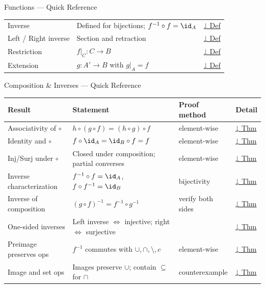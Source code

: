 \begin{toolkitbox}{Functions — Quick Reference}
\begin{tabular}{l l l}
Inverse           & Defined for bijections; $f^{-1} \circ f = \id_A$            & \hyperref[def:inverse]{↓ Def} \\
Left / Right inverse & Section and retraction                                  & \hyperref[def:left-right-inverse]{↓ Def} \\
Restriction       & $f|_C : C \to B$                                            & \hyperref[def:restriction]{↓ Def} \\
Extension         & $g : A' \to B$ with $g|_A = f$                              & \hyperref[def:extension]{↓ Def} \\
\bottomrule
\end{tabular}
\end{toolkitbox}



\begin{toolkitbox}{Composition \& Inverses — Quick Reference}
\small
\begin{tabular}{l l l l}
\toprule
\textbf{Result} & \textbf{Statement} & \textbf{Proof method} & \textbf{Detail} \\
\midrule
Associativity of $\circ$ & $h \circ (g \circ f) = (h \circ g) \circ f$ & element-wise & \hyperref[thm:comp-assoc]{↓ Thm} \\
Identity and $\circ$     & $f \circ \id_A = \id_B \circ f = f$          & element-wise & \hyperref[thm:comp-id]{↓ Thm} \\
Inj/Surj under $\circ$   & Closed under composition; partial converses  & element-wise & \hyperref[thm:comp-inj-surj]{↓ Thm} \\
Inverse characterization & $f^{-1}\circ f = \id_A$, $f \circ f^{-1} = \id_B$ & bijectivity & \hyperref[thm:inverse-char]{↓ Thm} \\
Inverse of composition   & $(g \circ f)^{-1} = f^{-1} \circ g^{-1}$    & verify both sides & \hyperref[thm:inverse-comp]{↓ Thm} \\
One-sided inverses       & Left inverse $\iff$ injective; right $\iff$ surjective & & \hyperref[thm:one-sided]{↓ Thm} \\
Preimage preserves ops   & $f^{-1}$ commutes with $\cup,\cap,\setminus,c$ & element-wise & \hyperref[thm:preimage-ops]{↓ Thm} \\
Image and set ops        & Images preserve $\cup$; contain $\subseteq$ for $\cap$ & counterexample & \hyperref[thm:image-ops]{↓ Thm} \\
\bottomrule
\end{tabular}
\end{toolkitbox}


